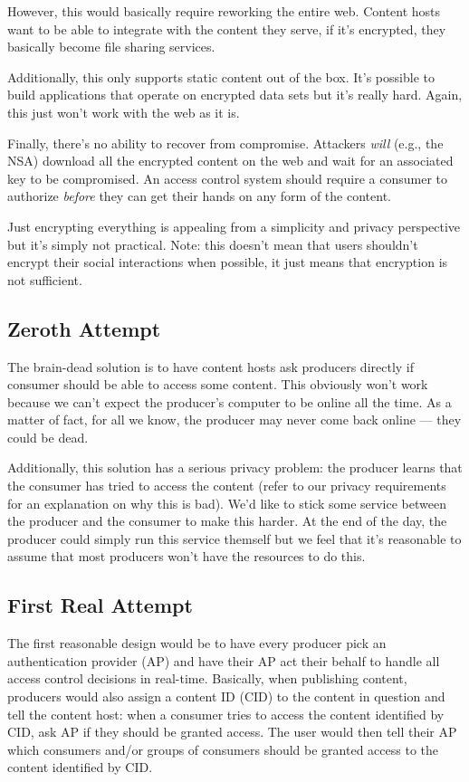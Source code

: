 \documentclass[pdftex,12pt,a4papaer,twoside,notitlepage]{report}
\begin{document}
However, this would basically require reworking the entire web. Content hosts
want to be able to integrate with the content they serve, if it's encrypted,
they basically become file sharing services.

Additionally, this only supports static content out of the box. It's possible to
build applications that operate on encrypted data sets but it's really hard.
Again, this just won't work with the web as it is.

Finally, there's no ability to recover from compromise. Attackers \emph{will}
(e.g., the NSA) download all the encrypted content on the web and wait for an
associated key to be compromised. An access control system should require a
consumer to authorize \emph{before} they can get their hands on any form of the
content.

Just encrypting everything is appealing from a simplicity and privacy
perspective but it's simply not practical. Note: this doesn't mean that users
shouldn't encrypt their social interactions when possible, it just means that
encryption is not sufficient.

\subsection{Zeroth Attempt}

The brain-dead solution is to have content hosts ask producers directly if
consumer should be able to access some content. This obviously won't work
because we can't expect the producer's computer to be online all the time. As a
matter of fact, for all we know, the producer may never come back online ---
they could be dead.

Additionally, this solution has a serious privacy problem: the producer learns
that the consumer has tried to access the content (refer to our privacy
requirements for an explanation on why this is bad). We'd like to stick some
service between the producer and the consumer to make this harder. At the end of
the day, the producer could simply run this service themself but we feel that
it's reasonable to assume that most producers won't have the resources to do
this.

\subsection{First Real Attempt}

The first reasonable design would be to have every producer pick an
authentication provider (AP) and have their AP act their behalf to handle all
access control decisions in real-time. Basically, when publishing content,
producers would also assign a content ID (CID) to the content in question and
tell the content host: when a consumer tries to access the content identified by
CID, ask AP if they should be granted access. The user would then tell their AP
which consumers and/or groups of consumers should be granted access to the
content identified by CID.
\end{document}
